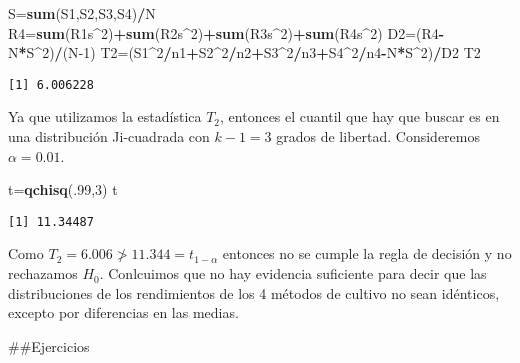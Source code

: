 \documentclass[
  a4paper,
  oneside,
  openany]{book}
\newenvironment{Shaded}{\begin{snugshade}}{\end{snugshade}}
\newcommand{\DecValTok}[1]{\textcolor[rgb]{0.00,0.00,0.81}{#1}}
\newcommand{\KeywordTok}[1]{\textcolor[rgb]{0.13,0.29,0.53}{\textbf{#1}}}
\newcommand{\NormalTok}[1]{#1}
\newcommand{\OperatorTok}[1]{\textcolor[rgb]{0.81,0.36,0.00}{\textbf{#1}}}
\begin{document}
\begin{Shaded}
\begin{Highlighting}[]
\NormalTok{S=}\KeywordTok{sum}\NormalTok{(S1,S2,S3,S4)}\OperatorTok{/}\NormalTok{N}
\NormalTok{R4=}\KeywordTok{sum}\NormalTok{(R1s}\OperatorTok{\^{}}\DecValTok{2}\NormalTok{)}\OperatorTok{+}\KeywordTok{sum}\NormalTok{(R2s}\OperatorTok{\^{}}\DecValTok{2}\NormalTok{)}\OperatorTok{+}\KeywordTok{sum}\NormalTok{(R3s}\OperatorTok{\^{}}\DecValTok{2}\NormalTok{)}\OperatorTok{+}\KeywordTok{sum}\NormalTok{(R4s}\OperatorTok{\^{}}\DecValTok{2}\NormalTok{)}
\NormalTok{D2=(R4}\OperatorTok{{-}}\NormalTok{N}\OperatorTok{*}\NormalTok{S}\OperatorTok{\^{}}\DecValTok{2}\NormalTok{)}\OperatorTok{/}\NormalTok{(N}\DecValTok{{-}1}\NormalTok{)}
\NormalTok{T2=(S1}\OperatorTok{\^{}}\DecValTok{2}\OperatorTok{/}\NormalTok{n1}\OperatorTok{+}\NormalTok{S2}\OperatorTok{\^{}}\DecValTok{2}\OperatorTok{/}\NormalTok{n2}\OperatorTok{+}\NormalTok{S3}\OperatorTok{\^{}}\DecValTok{2}\OperatorTok{/}\NormalTok{n3}\OperatorTok{+}\NormalTok{S4}\OperatorTok{\^{}}\DecValTok{2}\OperatorTok{/}\NormalTok{n4}\OperatorTok{{-}}\NormalTok{N}\OperatorTok{*}\NormalTok{S}\OperatorTok{\^{}}\DecValTok{2}\NormalTok{)}\OperatorTok{/}\NormalTok{D2}
\NormalTok{T2}
\end{Highlighting}
\end{Shaded}

\begin{verbatim}
[1] 6.006228
\end{verbatim}

Ya que utilizamos la estadística \(T_2\), entonces el cuantil que hay que buscar es en una distribución Ji-cuadrada con \(k-1=3\) grados de libertad. Consideremos \(\alpha=0.01\).

\begin{Shaded}
\begin{Highlighting}[]
\NormalTok{t=}\KeywordTok{qchisq}\NormalTok{(.}\DecValTok{99}\NormalTok{,}\DecValTok{3}\NormalTok{)}
\NormalTok{t}
\end{Highlighting}
\end{Shaded}

\begin{verbatim}
[1] 11.34487
\end{verbatim}

Como \(T_2=6.006\ngtr11.344=t_{1-\alpha}\) entonces no se cumple la regla de decisión y no rechazamos \(H_0\). Conlcuimos que no hay evidencia suficiente para decir que las distribuciones de los rendimientos de los 4 métodos de cultivo no sean idénticos, excepto por diferencias en las medias.

\#\#Ejercicios
\end{document}
